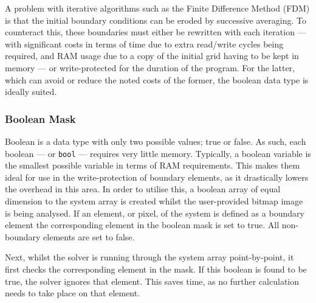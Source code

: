 		A problem with iterative algorithms such as the Finite Difference Method (FDM) is that the initial boundary conditions can be eroded by successive averaging. To counteract this, these boundaries must either be rewritten with each iteration --- with significant costs in terms of time due to extra read/write cycles being required, and RAM usage due to a copy of the initial grid having to be kept in memory --- or write-protected for the duration of the program. For the latter, which can avoid or reduce the noted costs of the former, the boolean data type is ideally suited.
		
		\subsubsection{Boolean Mask}
		
		Boolean is a data type with only two possible values; true or false. As such, each boolean --- or \lstinline|bool| --- requires very little memory. Typically, a boolean variable is the smallest possible variable in terms of RAM requirements. This makes them ideal for use in the write-protection of boundary elements, as it drastically lowers the overhead in this area. In order to utilise this, a boolean array of equal dimension to the system array is created whilst the user-provided bitmap image is being analysed. If an element, or pixel, of the system is defined as a boundary element the corresponding element in the boolean mask is set to true. All non-boundary elements are set to false.
		
		Next, whilst the solver is running through the system array point-by-point, it first checks the corresponding element in the mask. If this boolean is found to be true, the solver ignores that element. This saves time, as no further calculation needs to take place on that element.
